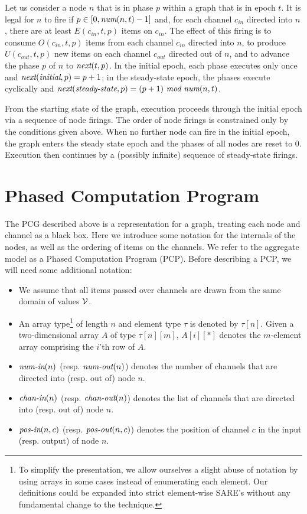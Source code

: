 Let us consider a node $n$ that is in phase $p$ within a graph that is
in epoch $t$.  It is legal for $n$ to fire if $p \in [0, \mbox{\it num}(n,
t)-1]$ and, for each channel $c_{in}$ directed into $n$, there are at
least $E(c_{in}, t, p)$ items on $c_{in}$.  The effect of this firing
is to consume $O(c_{in}, t, p)$ items from each channel $c_{in}$
directed into $n$, to produce $U(c_{out}, t, p)$ new items on each
channel $c_{out}$ directed out of $n$, and to advance the phase $p$ of
$n$ to $\mbox{\it next}(t, p)$.  In the initial epoch, each phase executes
only once and $\mbox{\it next}(\mbox{\it initial}, p) = p + 1$; in the
steady-state epoch, the phases execute cyclically and
$\mbox{\it next}(\mbox{\it steady-state}, p) = (p + 1)~\mbox{\it mod}~\mbox{\it num}(n, t)$.

From the starting state of the graph, execution proceeds through the
initial epoch via a sequence of node firings.  The order of node
firings is constrained only by the conditions given above.  When no
further node can fire in the initial epoch, the graph enters the
steady state epoch and the phases of all nodes are reset to 0.
Execution then continues by a (possibly infinite) sequence of
steady-state firings.

\section{Phased Computation Program}

The PCG described above is a representation for a graph, treating each
node and channel as a black box.  Here we introduce some notation for
the internals of the nodes, as well as the ordering of items on the
channels.  We refer to the aggregate model as a Phased Computation
Program (PCP).  Before describing a PCP, we will need some additional
notation:
\begin{itemize}

\item We assume that all items passed over channels are drawn from the
same domain of values ${\cal V}$.

\item An array type\footnote{To simplify the presentation, we allow
ourselves a slight abuse of notation by using arrays in some cases
instead of enumerating each element.  Our definitions could be
expanded into strict element-wise SARE's without any fundamental
change to the technique.} of length $n$ and element type $\tau$ is
denoted by $\tau[n]$.  Given a two-dimensional array $A$ of type
$\tau[n][m]$, $A[i][*]$ denotes the $m$-element array comprising the
$i$'th row of $A$.

\item $\mbox{\it num-in}(n)$ (resp. $\mbox{\it num-out}(n)$) denotes the number of
channels that are directed into (resp. out of) node $n$.

\item $\mbox{\it chan-in}(n)$ (resp. $\mbox{\it chan-out}(n)$) denotes the list of
channels that are directed into (resp. out of) node $n$.

\item $\mbox{\it pos-in}(n, c)$ (resp. $\mbox{\it pos-out}(n, c)$) denotes the
position of channel $c$ in the input (resp. output) of node $n$.

\end{itemize}

